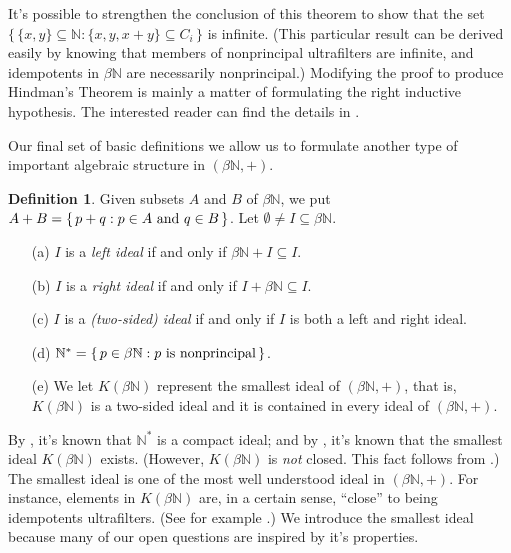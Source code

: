 \documentclass[12pt]{article}
\theoremstyle{plain}
\theoremstyle{definition}
\newtheorem{defn}[thm]{Definition}
\newcommand{\bbN}{\mathbb{N}}
\begin{document}
It's possible to strengthen the conclusion of this theorem to show
that the set $\bigl\{\, \{x, y\} \subseteq \bbN : \{x, y, x+y\}
\subseteq C_i\,\bigr\}$ is infinite.
(This particular result can be derived easily by knowing that members
of nonprincipal ultrafilters are infinite, and idempotents in
$\beta\bbN$ are necessarily nonprincipal.)
Modifying the proof to produce Hindman's Theorem is mainly a matter of
formulating the right inductive hypothesis.
The interested reader can find the details in \cite[Theorem
5.8]{Hindman:1998fk}. 

Our final set of basic definitions we allow us to formulate another type
of important algebraic structure in $(\beta\bbN, +)$. 
\begin{defn}
  Given subsets $A$ and $B$ of $\beta\bbN$, we put $A + B = \{\, p+q :
  \hbox{$p \in A$ and $q \in B$} \,\}$.
  Let $\emptyset \ne I \subseteq \beta\bbN$.
  \begin{itemize}
    \item[(a)] $I$ is a \textsl{left ideal} if and only if
      $\beta\bbN + I \subseteq I$.
    \item[(b)] $I$ is a \textsl{right ideal} if and only if
      $I+\beta\bbN \subseteq I$.
    \item[(c)] $I$ is a \textsl{(two-sided) ideal} if and only if
      $I$ is both a left and right ideal.
    \item[(d)] $\bbN^* = \{\, p \in \beta\bbN : \hbox{$p$ is
        nonprincipal} \,\}$.
    \item[(e)] We let $K(\beta\bbN)$ represent the smallest ideal of
      $(\beta\bbN, +)$, that is, $K(\beta\bbN)$ is a two-sided ideal
      and it is contained in every ideal of $(\beta\bbN, +)$.
  \end{itemize}
\end{defn}

By \cite[Theorem 4.36]{Hindman:1998fk}, it's known that $\bbN^*$ is a
compact ideal; and by \cite[Theorem 4.36]{Hindman:1998fk}, it's known
that the smallest ideal $K(\beta\bbN)$ exists. 
(However, $K(\beta\bbN)$ is \textsl{not} closed. 
This fact follows from \cite[Theorem 4.4]{Hindman:1996uq}.)
The smallest ideal is one of the most well understood ideal in
$(\beta\bbN, +)$.
For instance, elements in $K(\beta\bbN)$ are, in a certain sense,
``close'' to being idempotents ultrafilters. 
(See for example \cite[Theorems 4.39 and 4.43]{Hindman:1998fk}.)
We introduce the smallest ideal because many of our open questions are
inspired by it's properties. 
\end{document}
